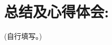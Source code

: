 \documentclass[a4paper,11pt,UTF8]{ctexart}
\begin{document}
\section{总结及心得体会:}

(自行填写。)




\vspace{4cm}
\begin{flushright}
\begin{tabular}{lc}
\end{tabular}
\end{flushright}
\end{document}
